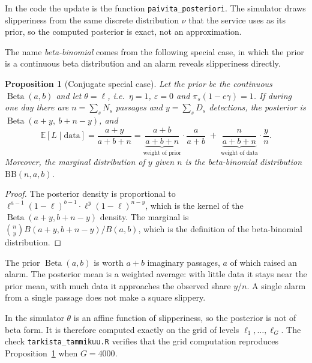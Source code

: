 \documentclass[11pt,a4paper]{article}
\theoremstyle{plain}
\newtheorem{propositio}{Proposition}
\theoremstyle{definition}
\theoremstyle{remark}
\newcommand{\E}{\mathbb{E}}
\newcommand{\1}{\mathbf{1}}
\newcommand{\Beta}{\operatorname{Beta}}
\begin{document}
In the code the update is the function \texttt{paivita\_posteriori}. The
simulator draws slipperiness from the same discrete distribution $\nu$ that the
service uses as its prior, so the computed posterior is exact, not an
approximation.

The name \emph{beta-binomial} comes from the following special case, in which the
prior is a continuous beta distribution and an alarm reveals slipperiness
directly.

\begin{propositio}[Conjugate special case]\label{pr:konjugaatti}
Let the prior be the continuous $\Beta(a,b)$ and let $\theta = \ell$, i.e.\
$\eta = 1$, $\varepsilon = 0$ and $\pi_s(1 - e\gamma) = 1$. If during one day there
are $n = \sum_s N_s$ passages and $y = \sum_s D_s$ detections, the posterior is
$\Beta(a + y,\ b + n - y)$, and
\[
  \E[L \mid \text{data}] = \frac{a + y}{a + b + n}
  = \underbrace{\frac{a + b}{a + b + n}}_{\text{weight of prior}}\cdot\frac{a}{a+b}
  \;+\; \underbrace{\frac{n}{a + b + n}}_{\text{weight of data}}\cdot\frac{y}{n}.
\]
Moreover, the marginal distribution of $y$ given $n$ is the beta-binomial
distribution $\mathrm{BB}(n, a, b)$.
\end{propositio}

\begin{proof}
The posterior density is proportional to
$\ell^{a-1}(1-\ell)^{b-1} \cdot \ell^{y}(1-\ell)^{n-y}$, which is the kernel of the
$\Beta(a+y, b+n-y)$ density. The marginal is
$\binom{n}{y} B(a+y, b+n-y)/B(a,b)$, which is the definition of the beta-binomial
distribution.
\end{proof}

\begin{intuitio}
The prior $\Beta(a,b)$ is worth $a + b$ imaginary passages, $a$ of which raised
an alarm. The posterior mean is a weighted average: with little data it stays
near the prior mean, with much data it approaches the observed share $y/n$. A
single alarm from a single passage does not make a square slippery.

In the simulator $\theta$ is an affine function of slipperiness, so the posterior
is not of beta form. It is therefore computed exactly on the grid of levels
$\ell_1, \dots, \ell_G$. The check \texttt{tarkista\_tammikuu.R} verifies that the
grid computation reproduces Proposition~\ref{pr:konjugaatti} when $G = 4000$.
\end{intuitio}

\end{document}
